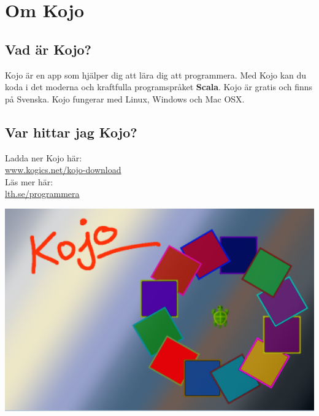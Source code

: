 \chapter{Om Kojo}
\begin{multicols}{2}
\section*{\color{black}Vad är Kojo?}
Kojo är en app som hjälper dig att lära dig att programmera. Med Kojo kan du koda i det moderna och kraftfulla programspråket {\bf\color{blue}Scala}. Kojo är gratis och finns på Svenska. Kojo fungerar med Linux, Windows och Mac OSX.
\section*{\color{black}Var hittar jag Kojo?}
Ladda ner Kojo här: 
\\

\href{http://www.kogics.net/kojo-download}{www.kogics.net/kojo-download}
\\

Läs mer här: 
\\

\href{http://lth.se/programmera}{lth.se/programmera}

\columnbreak

\begin{center}
\includegraphics[width=14.0cm]{../img/kojo.png}
\end{center}

\end{multicols}

